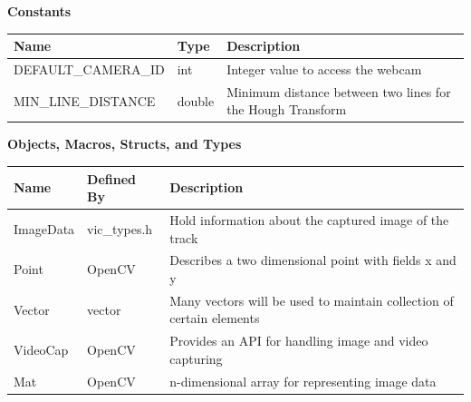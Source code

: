 \documentclass [10pt]{article}
\begin{document}
\textbf{Constants}
\begin{longtable}{ p{ }  p{ } p{}} \\ 

\rowcolor{tableCell} \textbf{Name} & \textbf{Type} & \textbf{Description} \\ \hline

\rowcolor{tableCell} DEFAULT\_CAMERA\_ID & int & Integer value to access the webcam  \\ \hline
\rowcolor{tableCell} MIN\_LINE\_DISTANCE & double & Minimum distance between two lines for the Hough Transform  \\

\end{longtable}




\textbf{Objects, Macros, Structs, and Types}
\begin{longtable}{ p{ }  p{ } p{}} \\ 

\rowcolor{tableCell} \textbf{Name} & \textbf{Defined By} & \textbf{Description} \\ \hline

\rowcolor{tableCell} ImageData & vic\_types.h &  Hold  information about the captured image of the track \\ \hline
\rowcolor{tableCell} Point & OpenCV & Describes a two dimensional point with fields x and y \\ \hline
\rowcolor{tableCell} Vector & vector & Many vectors will be used to maintain collection of certain elements \\ \hline
\rowcolor{tableCell} VideoCap & OpenCV  & Provides an API for handling image and video capturing \\ \hline
\rowcolor{tableCell} Mat & OpenCV  & n-dimensional array for representing image data \\ \hline

\end{longtable}
\end{document}
